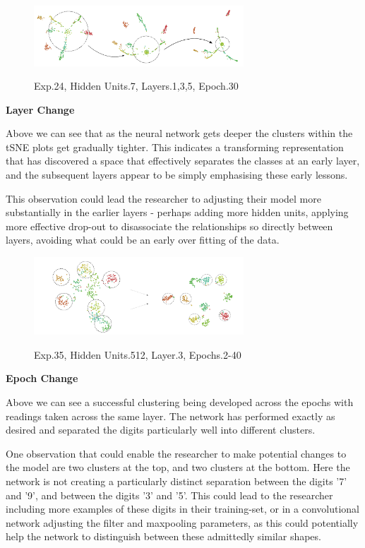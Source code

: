 \documentclass[a4paper,11pt,titlepage]{article}
\begin{document}
	\begin{figure}[H]
    			\centering	
			{{\includegraphics[width=0.7\textwidth]
    				{img/conc_X24_H7_L1-3-5_E30.png} 
    			}}%
    			\caption{Exp.24, Hidden Units.7, Layers.1,3,5, Epoch.30}%
    		\label{fig:mnistHinton}
	\end{figure}
	
	\textbf{Layer Change}
	\par
	Above we can see that as the neural network gets deeper the clusters within the tSNE plots get gradually tighter. This indicates a transforming representation that has discovered a space that effectively separates the classes at an early layer, and the subsequent layers appear to be simply emphasising these early lessons.
	\par 
	This observation could lead the researcher to adjusting their model more substantially in the earlier layers - perhaps adding more hidden units, applying more effective drop-out to disassociate the relationships so directly between layers, avoiding what could be an early over fitting of the data.

	\begin{figure}[H]
    			\centering	
			{{\includegraphics[width=0.7\textwidth]
    				{img/conc_X35_H512_L3_E2-40.png} 
    			}}%
    			\caption{Exp.35, Hidden Units.512, Layer.3, Epochs.2-40}%
    		\label{fig:mnistHinton}
	\end{figure}
	
	\textbf{Epoch Change}
	\par 
	Above we can see a successful clustering being developed across the epochs with readings taken across the same layer. The network has performed exactly as desired and separated the digits particularly well into different clusters.
	\par 
	One observation that could enable the researcher to make potential changes to the model are two clusters at the top, and two clusters at the bottom. Here the network is not creating a particularly distinct separation between the digits '7' and '9', and between the digits '3' and '5'. This could lead to the researcher including more examples of these digits in their training-set, or in a convolutional network adjusting the filter and maxpooling parameters, as this could potentially help the network to distinguish between these admittedly similar shapes.
\end{document}
